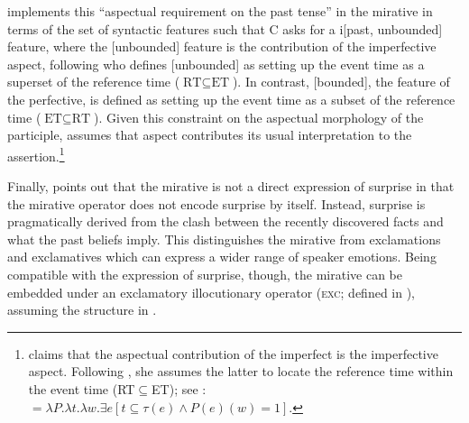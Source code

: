 \documentclass[output=paper,
colorlinks,
citecolor=brown,
newtxmath
]{langscibook}
\begin{document}
\citet[115]{Bustamante2013} implements this ``aspectual requirement on the past tense'' in the  mirative in terms of the set of syntactic features such that C asks for a i[past, unbounded] feature, where the [unbounded] feature is the
contribution of the imperfective aspect, following \citet{Pancheva2003} who defines [unbounded] as setting up the event time as a superset of the reference time ($\text{RT}\subseteq\text{ET}$). In contrast, [bounded], the feature of the perfective, is defined as setting up the event time as a subset of the reference time ($\text{ET}\subseteq\text{RT}$).
Given this constraint on the aspectual morphology of the participle, \citet[51]{Bustamante2013} assumes that aspect contributes its usual interpretation to the assertion.\footnote{\label{fn:34} \citet[51--52]{Bustamante2013} claims that the aspectual contribution of the imperfect is the imperfective aspect. Following \citet{Kratzer1998}, she assumes the latter to locate the reference time within the event time (RT$\subseteq$ET); see :
\ea\label{def:imperfect}
 $ = \lambda P.\lambda t.\lambda w. \exists e [t \subseteq \tau(e) \wedge P(e)(w)=1]$.
\z}




Finally, \cite[14]{Bustamante2013} points out that the  mirative is not a direct expression of surprise in that the mirative operator does not encode surprise by itself. Instead, surprise is pragmatically derived from the clash between the recently discovered facts and what the past beliefs imply. This distinguishes the  mirative from exclamations and exclamatives which can express a wider range of speaker emotions. Being compatible with the expression of surprise, though, the mirative can be embedded under an exclamatory illocutionary operator (\textsc{exc}; defined in \citealt{Gutierrez-Rexach1996}), assuming the structure in .
\end{document}

